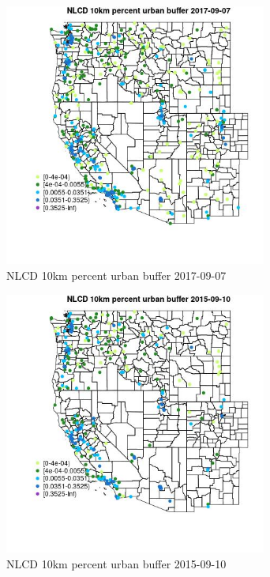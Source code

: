 \begin{figure} 
\centering  
\includegraphics[width=0.77\textwidth]{Code_Outputs/Report_ML_input_PM25_Step4_part_e_de_duplicated_aves_compiled_2019-05-21wNAs_MapObsNLCD_10km_percent_urban_buffer2017-09-07.jpg} 
\caption{\label{fig:Report_ML_input_PM25_Step4_part_e_de_duplicated_aves_compiled_2019-05-21wNAsMapObsNLCD_10km_percent_urban_buffer2017-09-07}NLCD 10km percent urban buffer 2017-09-07} 
\end{figure} 
 

\begin{figure} 
\centering  
\includegraphics[width=0.77\textwidth]{Code_Outputs/Report_ML_input_PM25_Step4_part_e_de_duplicated_aves_compiled_2019-05-21wNAs_MapObsNLCD_10km_percent_urban_buffer2015-09-10.jpg} 
\caption{\label{fig:Report_ML_input_PM25_Step4_part_e_de_duplicated_aves_compiled_2019-05-21wNAsMapObsNLCD_10km_percent_urban_buffer2015-09-10}NLCD 10km percent urban buffer 2015-09-10} 
\end{figure} 
 

